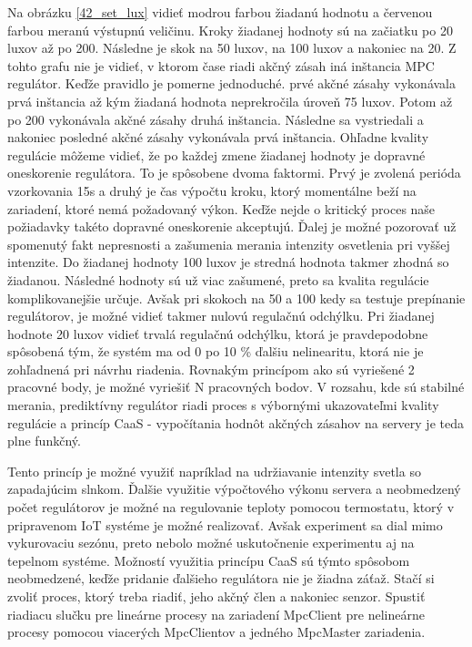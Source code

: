 Na obrázku \ref{42_set_lux} vidieť modrou farbou žiadanú hodnotu a červenou farbou meranú výstupnú veličinu. Kroky žiadanej hodnoty sú na začiatku po 20 luxov až po 200. Následne je skok na 50 luxov, na 100 luxov a nakoniec na 20. Z tohto grafu nie je vidieť, v ktorom čase riadi akčný zásah iná inštancia MPC regulátor. Keďže pravidlo je pomerne jednoduché. prvé akčné zásahy vykonávala prvá inštancia až kým žiadaná hodnota neprekročila úroveň 75 luxov. Potom až po 200 vykonávala akčné zásahy druhá inštancia. Následne sa vystriedali a nakoniec posledné akčné zásahy vykonávala prvá inštancia. Ohľadne kvality regulácie môžeme vidieť, že po každej zmene žiadanej hodnoty je dopravné oneskorenie regulátora. To je spôsobene dvoma faktormi. Prvý je zvolená perióda vzorkovania 15s a druhý je čas výpočtu kroku, ktorý momentálne beží na zariadení, ktoré nemá požadovaný výkon. Keďže nejde o kritický proces naše požiadavky takéto dopravné oneskorenie akceptujú. Ďalej je možné pozorovať už spomenutý fakt nepresnosti a zašumenia merania intenzity osvetlenia pri vyššej intenzite. Do žiadanej hodnoty 100 luxov je stredná hodnota takmer zhodná so žiadanou. Následné hodnoty sú už viac zašumené, preto sa kvalita regulácie komplikovanejšie určuje. Avšak pri skokoch na 50 a 100 kedy sa testuje prepínanie regulátorov, je možné vidieť takmer nulovú regulačnú odchýlku. Pri žiadanej hodnote 20 luxov vidieť trvalá regulačnú odchýlku, ktorá je pravdepodobne spôsobená tým, že systém ma od 0 po 10 \% ďalšiu nelinearitu, ktorá nie je zohľadnená pri návrhu riadenia. Rovnakým princípom ako sú vyriešené 2 pracovné body, je možné vyriešiť N pracovných bodov. V rozsahu, kde sú stabilné merania, prediktívny regulátor riadi proces s výbornými ukazovateľmi kvality regulácie a princíp CaaS - vypočítania hodnôt akčných zásahov na servery je teda plne funkčný.

\indent Tento princíp je možné využiť napríklad na udržiavanie intenzity svetla so zapadajúcim slnkom. Ďalšie využitie výpočtového výkonu servera a neobmedzený počet regulátorov je možné na regulovanie teploty pomocou termostatu, ktorý v pripravenom IoT systéme je možné realizovať. Avšak experiment sa dial mimo vykurovaciu sezónu, preto nebolo možné uskutočnenie experimentu aj na tepelnom systéme. Možností využitia princípu CaaS sú týmto spôsobom neobmedzené, keďže pridanie ďalšieho regulátora nie je žiadna záťaž. Stačí si zvoliť proces, ktorý treba riadiť, jeho akčný člen a nakoniec senzor. Spustiť riadiacu slučku pre lineárne procesy na zariadení MpcClient pre nelineárne procesy pomocou viacerých MpcClientov a jedného MpcMaster zariadenia.

